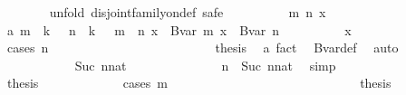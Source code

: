 \begin{isabellebody}
\ \ \ \ \ \ \isamarkupfalse%
\ {\isacharparenleft}{\kern0pt}unfold\ disjoint{\isacharunderscore}{\kern0pt}family{\isacharunderscore}{\kern0pt}on{\isacharunderscore}{\kern0pt}def{\isacharsemicolon}{\kern0pt}\ safe{\isacharparenright}{\kern0pt}\isanewline
\ \ \ \ \ \ \ \ \isamarkupfalse%
\ m\ n\ x\ \isamarkupfalse%
\ a{\isacharcolon}{\kern0pt}\ {\isachardoublequoteopen}m\ {\isacharless}{\kern0pt}\ k\ {\isacharplus}{\kern0pt}\ {}{\isachardoublequoteclose}\ {\isachardoublequoteopen}n\ {\isacharless}{\kern0pt}\ k\ {\isacharplus}{\kern0pt}\ {}{\isachardoublequoteclose}\ {\isachardoublequoteopen}m\ {\isasymnoteq}\ n{\isachardoublequoteclose}\ {\isachardoublequoteopen}x\ {\isasymin}\ Bvar\ m{\isachardoublequoteclose}\ {\isachardoublequoteopen}x\ {\isasymin}\ Bvar\ n{\isachardoublequoteclose}\isanewline
\ \ \ \ \ \ \ \ \isamarkupfalse%
\ {\isachardoublequoteopen}x\ {\isasymin}\ {\isacharbraceleft}{\kern0pt}{\isacharbraceright}{\kern0pt}{\isachardoublequoteclose}\isanewline
\ \ \ \ \ \ \ \ \isamarkupfalse%
\ {\isacharparenleft}{\kern0pt}cases\ {\isachardoublequoteopen}n{\isachardoublequoteclose}{\isacharparenright}{\kern0pt}\isanewline
\ \ \ \ \ \ \ \ \ \ \isamarkupfalse%
\ {}\isanewline
\ \ \ \ \ \ \ \ \ \ \isamarkupfalse%
\ \isamarkupfalse%
\ {\isacharquery}{\kern0pt}thesis\ \isamarkupfalse%
\ a\ fact{}\ \isamarkupfalse%
\ Bvar{\isacharunderscore}{\kern0pt}def\ \isamarkupfalse%
\ auto\isanewline
\ \ \ \ \ \ \ \ \isamarkupfalse%
\isanewline
\ \ \ \ \ \ \ \ \ \ \isamarkupfalse%
\ {\isacharparenleft}{\kern0pt}Suc\ nnat{\isacharparenright}{\kern0pt}\isanewline
\ \ \ \ \ \ \ \ \ \ \isamarkupfalse%
\ \isamarkupfalse%
\ {\isacharasterisk}{\kern0pt}{\isacharcolon}{\kern0pt}\ {\isachardoublequoteopen}n\ {\isacharequal}{\kern0pt}\ Suc\ nnat{\isachardoublequoteclose}\ \isamarkupfalse%
\ simp\isanewline
\ \ \ \ \ \ \ \ \ \ \isamarkupfalse%
\ \isamarkupfalse%
\ {\isacharquery}{\kern0pt}thesis\ \isanewline
\ \ \ \ \ \ \ \ \ \ \isamarkupfalse%
\ {\isacharparenleft}{\kern0pt}cases\ m{\isacharparenright}{\kern0pt}\isanewline
\ \ \ \ \ \ \ \ \ \ \ \ \isamarkupfalse%
\ {}\isanewline
\ \ \ \ \ \ \ \ \ \ \ \ \isamarkupfalse%
\ \isamarkupfalse%
\ {\isacharquery}{\kern0pt}thesis\ \isamarkupfalse%

\end{isabellebody}
